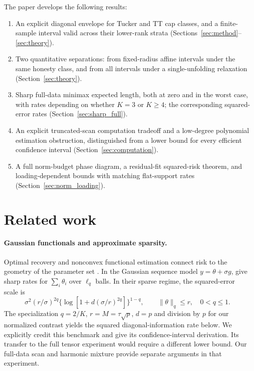 \documentclass[11pt]{article}
\theoremstyle{remark}
\newcommand{\norm}[1]{\lVert #1\rVert}
\begin{document}
The paper develops the following results:
\begin{enumerate}
\item An explicit diagonal envelope for Tucker and TT cap classes, and a finite-sample interval valid across their lower-rank strata (Sections~\ref{sec:method}--\ref{sec:theory}).
\item Two quantitative separations: from fixed-radius affine intervals under the same honesty class, and from all intervals under a single-unfolding relaxation (Section~\ref{sec:theory}).
\item Sharp full-data minimax expected length, both at zero and in the worst case, with rates depending on whether $K=3$ or $K\ge4$; the corresponding squared-error rates (Section~\ref{sec:sharp_full}).
\item An explicit truncated-scan computation tradeoff and a low-degree polynomial estimation obstruction, distinguished from a lower bound for every efficient confidence interval (Section~\ref{sec:computation}).
\item A full norm-budget phase diagram, a residual-fit squared-risk theorem, and loading-dependent bounds with matching flat-support rates (Section~\ref{sec:norm_loading}).
\end{enumerate}

\section{Related work}\label{sec:related}

\paragraph{Gaussian functionals and approximate sparsity.}
Optimal recovery and nonconvex functional estimation connect risk to the geometry of the parameter set \citep{donoho1994,cailownonconvex2004}. In the Gaussian sequence model $y=\theta+\sigma g$, \citet{collier2017} give sharp rates for $\sum_i\theta_i$ over $\ell_q$ balls. In their sparse regime, the squared-error scale is
\[
 \sigma^2(r/\sigma)^{2q}
 \{\log[1+d(\sigma/r)^{2q}]\}^{1-q},
 \qquad \norm\theta_q\le r,\quad 0<q\le1.
\]
The specialization $q=2/K$, $r=M=\tau\sqrt p$, $d=p$ and division by $p$ for our normalized contrast yields the squared diagonal-information rate below. We explicitly credit this benchmark and give its confidence-interval derivation. Its transfer to the full tensor experiment would require a different lower bound. Our full-data scan and harmonic mixture provide separate arguments in that experiment.
\end{document}

